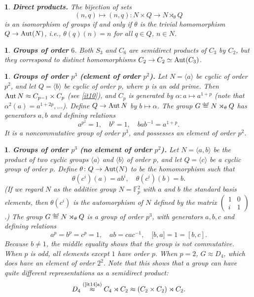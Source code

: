 \documentclass[a4paper,11pt,final]{memoir}%
\newtheorem{plain}[X]{}
\theoremstyle{nonumberplain}
\begin{document}
\begin{plain}
\label{it16b}\textbf{Direct products. }The bijection of sets
\[
(n,q)\mapsto(n,q)\colon N\times Q\rightarrow N\rtimes_{\theta}Q
\]
is an isomorphism of groups if and only if $\theta$ is the trivial
homomorphism $Q\rightarrow\operatorname{Aut}(N)$, i.e., $\theta(q)(n)=n$ for all $q\in Q$,
$n\in N$.
\end{plain}

\begin{plain}
\label{it16c}\textbf{Groups of order }$6$. Both $S_{3}$ and $C_{6}$ are
semidirect products of $C_{3}$ by $C_{2}$, but they correspond to distinct
homomorphisms $C_{2}\rightarrow C_{2}\simeq\operatorname{Aut}(C_{3})$.
\end{plain}

\begin{plain}
\label{it16e}\textbf{Groups of order }$p^{3}$ \textbf{(element of order
}$p^{2}$\textbf{). }Let $N=\langle a\rangle$ be cyclic of order $p^{2}$, and
let $Q=\langle b\rangle$ be cyclic of order $p$, where $p$ is an odd prime.
Then $\operatorname{Aut} N\approx C_{p-1}\times C_{p}$ (see \ref{it10}), and $C_{p}$ is
generated by $\alpha\colon a\mapsto a^{1+p}$ (note that $\alpha^{2}%
(a)=a^{1+2p},\ldots$). Define $Q\rightarrow\operatorname{Aut} N$ by $b\mapsto\alpha$. The
group $G\overset{\df}{=}N\rtimes_{\theta}Q$ has generators
$a,b$ and defining relations
\[
a^{p^{2}}=1,\quad b^{p}=1,\quad bab^{-1}=a^{1+p}.
\]
It is a noncommutative group of order $p^{3}$, and possesses an element of
order $p^{2}$.
\end{plain}

\begin{plain}
\label{it16d}\textbf{Groups of order }$p^{3}$ \textbf{(no element of order
}$p^{2}$\textbf{). }Let $N=\langle a,b\rangle$ be the product of two cyclic
groups $\langle a\rangle$ and $\langle b\rangle$ of order $p$, and let
$Q=\langle c\rangle$ be a cyclic group of order $p$. Define $\theta\colon
Q\rightarrow\operatorname{Aut}(N)$ to be the homomorphism such that%
\[
\theta(c^{i})(a)=ab^{i},\quad\theta(c^{i})(b)=b\text{.}%
\]
(If we regard $N$ as the additive group $N=\mathbb{F}{}_{p}^{2}$ with $a$ and
$b$ the standard basis elements, then $\theta(c^{i})$ is the automorphism of
$N$ defined by the matrix $%
\begin{pmatrix}
1 & 0\\
i & 1
\end{pmatrix}
$.) The group $G\overset{\df}{=}N\rtimes_{\theta}Q$ is a group
of order $p^{3}$, with generators $a,b,c$ and defining relations
\[
a^{p}=b^{p}=c^{p}=1,\quad ab=cac^{-1},\quad\lbrack b,a]=1=[b,c].
\]
Because $b\neq1$, the middle equality shows that the group is not commutative.
When $p$ is odd, all elements except $1$ have order $p$. When $p=2$, $G\approx
D_{4}$, which does have an element of order $2^{2}.$ Note that this shows that
a group can have quite different representations as a semidirect product:
\[
D_{4}\overset{(\text{\ref{it14}a)}}{\approx}C_{4}\rtimes C_{2}\approx
(C_{2}\times C_{2})\rtimes C_{2}.
\]

\end{plain}
\end{document}
